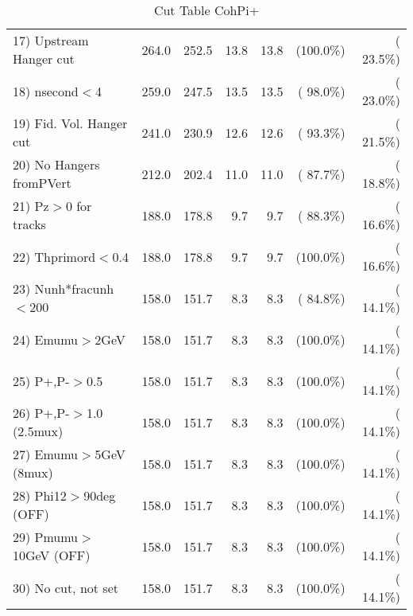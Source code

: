 \begin{table}[h!]
\begin{tabular}{||l||r|r|r|r|r|r||}
 17) Upstream Hanger cut  &        264.0 &        252.5 &         13.8 &         13.8 & (100.0\%) & ( 23.5\%) \\
 18) nsecond$<$4          &        259.0 &        247.5 &         13.5 &         13.5 & ( 98.0\%) & ( 23.0\%) \\
 19) Fid. Vol. Hanger cut &        241.0 &        230.9 &         12.6 &         12.6 & ( 93.3\%) & ( 21.5\%) \\
 20) No Hangers fromPVert &        212.0 &        202.4 &         11.0 &         11.0 & ( 87.7\%) & ( 18.8\%) \\
 21) Pz$>$0 for tracks    &        188.0 &        178.8 &          9.7 &          9.7 & ( 88.3\%) & ( 16.6\%) \\
 22) Thprimord$<$0.4      &        188.0 &        178.8 &          9.7 &          9.7 & (100.0\%) & ( 16.6\%) \\
 23) Nunh*fracunh$<$200   &        158.0 &        151.7 &          8.3 &          8.3 & ( 84.8\%) & ( 14.1\%) \\
 24) Emumu$>$2GeV         &        158.0 &        151.7 &          8.3 &          8.3 & (100.0\%) & ( 14.1\%) \\
 25) P+,P-$>$0.5          &        158.0 &        151.7 &          8.3 &          8.3 & (100.0\%) & ( 14.1\%) \\
 26) P+,P-$>$1.0 (2.5mux) &        158.0 &        151.7 &          8.3 &          8.3 & (100.0\%) & ( 14.1\%) \\
 27) Emumu$>$5GeV  (8mux) &        158.0 &        151.7 &          8.3 &          8.3 & (100.0\%) & ( 14.1\%) \\
 28) Phi12$>$90deg  (OFF) &        158.0 &        151.7 &          8.3 &          8.3 & (100.0\%) & ( 14.1\%) \\
 29) Pmumu$>$10GeV  (OFF) &        158.0 &        151.7 &          8.3 &          8.3 & (100.0\%) & ( 14.1\%) \\
 30) No cut, not set      &        158.0 &        151.7 &          8.3 &          8.3 & (100.0\%) & ( 14.1\%) \\
 \hline
 \hline
 \end{tabular}
 \caption{Cut Table  CohPi+   }
 \label{tab-cutcohjpsi-mumu_nuecc}
 \end{table}
